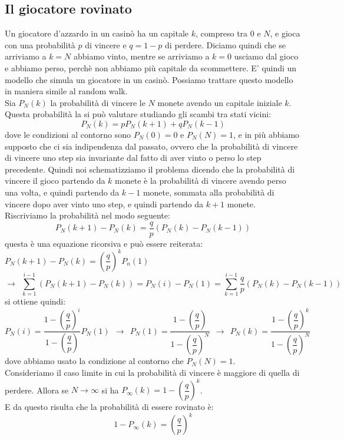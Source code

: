 \documentclass[12pt]{article}
\begin{document}
\subsection{Il giocatore rovinato}
Un giocatore d'azzardo in un casinò ha un capitale $k$, compreso tra $0$ e $N$, e gioca con una probabilità $p$ di vincere e $q = 1 - p$ di perdere. Diciamo quindi che se arriviamo a $k=N$ abbiamo vinto, mentre se arriviamo a $k=0$ usciamo dal gioco e abbiamo perso, perchè non abbiamo più capitale da scommettere. E' quindi un modello che simula un giocatore in un casinò. Possiamo trattare questo modello in maniera simile al random walk. \\
Sia $P_N(k)$ la probabilità di vincere le $N$ monete avendo un capitale iniziale $k$. Questa probabilità la si può valutare studiando gli scambi tra stati vicini:
$$
	P_N(k) = pP_N(k+1) + q P_N(k-1)
$$
dove le condizioni al contorno sono $P_N(0) = 0$ e $P_N(N) = 1$, e in più abbiamo supposto che ci sia indipendenza dal passato, ovvero che la probabilità di vincere di vincere uno step sia invariante dal fatto di aver vinto o perso lo step precedente. Quindi noi schematizziamo il problema dicendo che la probabilità di vincere il gioco partendo da $k$ monete è la probabilità di vincere avendo perso una volta, e quindi partendo da $k-1$ monete, sommata alla probabilità di vincere dopo aver vinto uno step, e quindi partendo da $k+1$ monete. \\
Riscriviamo la probabilità nel modo seguente:
$$
	P_N(k+1) - P_N(k) = \frac{q}{p} (P_N(k) - P_N(k-1))
$$
questa è una equazione ricorsiva e può essere reiterata: $ P_N(k+1) - P_N(k) = \left(\dfrac{q}{p} \right)^k P_n(1) $
$$
	  \longrightarrow \ \ \sum_{k=1}^{i-1}(P_N(k+1)-P_N(k)) = P_N(i)-P_N(1) = \sum_{k=1}^{i-1} \frac{q}{p} (P_N(k) - P_N(k-1))
$$
si ottiene quindi:
$$
	P_N(i) = \frac{1-\left(\dfrac{q}{p} \right)^i}{1-\left(\dfrac{q}{p}\right)}P_N(1) \ \ \longrightarrow \ \ P_N(1) = \frac{1-\left(\dfrac{q}{p}\right)}{1-\left(\dfrac{q}{p}\right)^N} \ \ 
	\longrightarrow \ \ P_N(k) = \frac{1-\left(\dfrac{q}{p}\right)^k}{1-\left(\dfrac{q}{p}\right)^N}
$$
dove abbiamo usato la condizione al contorno che $P_N(N) = 1$. \\
Consideriamo il caso limite in cui la probabilità di vincere è maggiore di quella di perdere. Allora se $N \rightarrow \infty$ si ha $P_\infty (k) = 1 - \left(\dfrac{q}{p} \right)^k$. \\
E da questo risulta che la probabilità di essere rovinato è:
\begin{equation}
	1-P_\infty (k) =  \left(\frac{q}{p} \right)^k
\end{equation}
\end{document}
